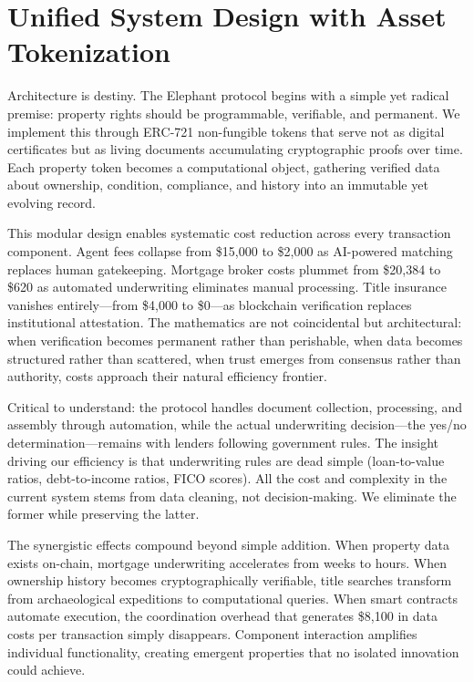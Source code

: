 \section{Unified System Design with Asset Tokenization}

Architecture is destiny. The Elephant protocol begins with a simple yet radical premise: property rights should be programmable, verifiable, and permanent. We implement this through ERC-721 non-fungible tokens that serve not as digital certificates but as living documents accumulating cryptographic proofs over time. Each property token becomes a computational object, gathering verified data about ownership, condition, compliance, and history into an immutable yet evolving record.

This modular design enables systematic cost reduction across every transaction component. Agent fees collapse from \$15{,}000 to \$2{,}000 as AI-powered matching replaces human gatekeeping. Mortgage broker costs plummet from \$20{,}384 to \$620 as automated underwriting eliminates manual processing. Title insurance vanishes entirely—from \$4{,}000 to \$0—as blockchain verification replaces institutional attestation. The mathematics are not coincidental but architectural: when verification becomes permanent rather than perishable, when data becomes structured rather than scattered, when trust emerges from consensus rather than authority, costs approach their natural efficiency frontier.

Critical to understand: the protocol handles document collection, processing, and assembly through automation, while the actual underwriting decision—the yes/no determination—remains with lenders following government rules. The insight driving our efficiency is that underwriting rules are dead simple (loan-to-value ratios, debt-to-income ratios, FICO scores). All the cost and complexity in the current system stems from data cleaning, not decision-making. We eliminate the former while preserving the latter.

The synergistic effects compound beyond simple addition. When property data exists on-chain, mortgage underwriting accelerates from weeks to hours. When ownership history becomes cryptographically verifiable, title searches transform from archaeological expeditions to computational queries. When smart contracts automate execution, the coordination overhead that generates \$8{,}100 in data costs per transaction simply disappears. Component interaction amplifies individual functionality, creating emergent properties that no isolated innovation could achieve.

